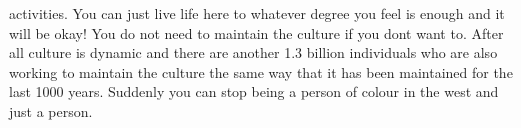 activities. You can just live life here to whatever degree you feel is enough and it will be okay! You do not need to maintain the culture if you dont want to. After all culture is dynamic and there are another 1.3 billion individuals who are also working to maintain the culture the same way that it has been maintained for the last 1000 years. Suddenly you can stop being a person of colour in the west and just a person.